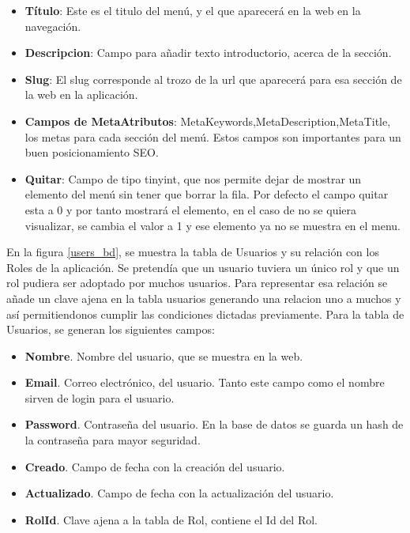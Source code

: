 \begin{itemize}

\item \textbf{Título}: Este es el titulo del menú, y el que aparecerá en la web en la navegación.
\item \textbf{Descripcion}: Campo para añadir texto introductorio, acerca de la sección.
\item \textbf{Slug}: El slug corresponde al trozo de la url que aparecerá para esa sección de la web en la aplicación.
\item \textbf{Campos de MetaAtributos}: MetaKeywords,MetaDescription,MetaTitle, los metas para cada sección del menú. Estos campos son importantes para un buen posicionamiento SEO.
\item \textbf{Quitar}: Campo de tipo tinyint, que nos permite dejar de mostrar un elemento del menú sin tener que borrar la fila. Por defecto el campo quitar esta a 0 y por tanto mostrará el elemento, en el caso de no se quiera visualizar, se cambia el valor a 1 y ese elemento ya no se muestra en el menu.

\end{itemize}

\vspace{5 mm}

En la figura \ref{users_bd}, se muestra la tabla de Usuarios y su relación con los Roles de la aplicación. Se pretendía que un usuario tuviera un único rol y que un rol pudiera ser adoptado por muchos usuarios. Para representar esa relación se añade un clave ajena en la tabla usuarios generando una relacion uno a muchos y así permitiendonos cumplir las condiciones dictadas previamente. Para la tabla de Usuarios, se generan los siguientes campos:

\begin{itemize}

\item \textbf{Nombre}. Nombre del usuario, que se muestra en la web.
\item \textbf{Email}. Correo electrónico, del usuario. Tanto este campo como el nombre sirven de login para el usuario.
\item \textbf{Password}. Contraseña del usuario. En la base de datos se guarda un hash de la contraseña para mayor seguridad.
\item \textbf{Creado}. Campo de fecha con la creación del usuario.
\item \textbf{Actualizado}. Campo de fecha con la actualización del usuario.
\item \textbf{RolId}. Clave ajena a la tabla de Rol, contiene el Id del Rol.

\end{itemize}

